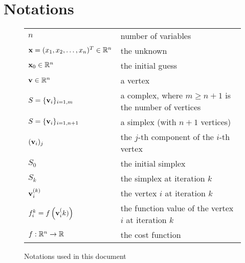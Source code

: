 %

\chapter*{Notations}


\begin{figure}[h]
\begin{center}
\begin{tabular}{|l|l|}
\hline
$n$ & number of variables\\
$\mathbf{x}=(x_1,x_2,\ldots,x_n)^T \in\mathbb{R}^n$ & the unknown\\
$\mathbf{x}_0\in\mathbb{R}^n$ & the initial guess\\
$\mathbf{v}\in\mathbb{R}^n$ & a vertex\\
$S=\{\mathbf{v}_i\}_{i=1,m}$ & a complex, where $m\geq n+1$ is the number of vertices\\
$S=\{\mathbf{v}_i\}_{i=1,n+1}$ & a simplex (with $n+1$ vertices)\\
$(\mathbf{v}_i)_j$ & the $j$-th component of the $i$-th vertex\\
$S_0$& the initial simplex\\
$S_k$& the simplex at iteration $k$\\
$\mathbf{v}_i^{(k)}$& the vertex $i$ at iteration $k$\\
$f^k_i = f\left( \mathbf{v}_i^(k) \right)$& the function value of the vertex $i$ at iteration $k$\\
$f:\mathbb{R}^n\rightarrow\mathbb{R}$& the cost function\\
\hline
\end{tabular}
\end{center}
\caption{Notations used in this document}
\label{fig-notations}
\end{figure}
